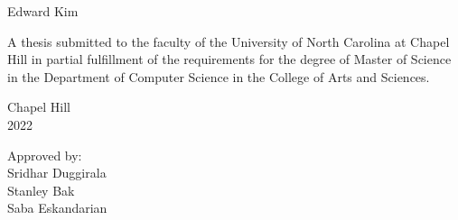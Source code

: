 \begin{titlepage}
\begin{center}


\vspace{2in}
\begin{singlespace}
\Large \bf \thesistitle
\end{singlespace}


\vspace{61pt} %
\large
Edward Kim
\end{center}



\vspace{50pt}
\begin{singlespace}
\noindent \large
A thesis submitted to the faculty of the University of North Carolina at Chapel Hill
in partial fulfillment of the requirements for the degree of Master of Science in
the Department of Computer Science in the College of Arts and Sciences.
\end{singlespace}


\vspace{50pt}
\begin{center}
\begin{singlespace} \large
Chapel Hill\\
2022
\end{singlespace}
\end{center}


\vfill
\begin{flushright}
\begin{minipage}[t]{1.5in} \large
Approved by:\\
Sridhar Duggirala \\
Stanley Bak \\
Saba Eskandarian \\
\end{minipage}
\end{flushright}

\end{titlepage}
